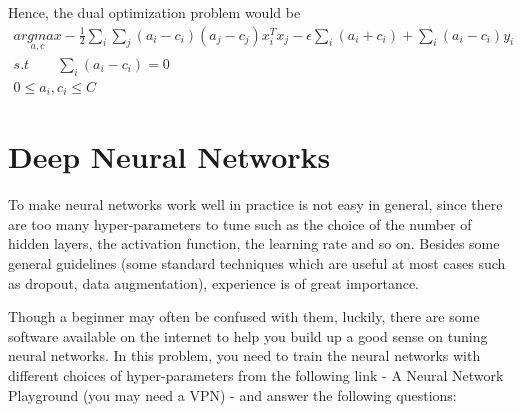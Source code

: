 \documentclass[12pt,a4paper]{article}
\begin{document}
	\noindent Hence, the dual optimization problem would be
	\begin{align*}
		\underset{a, c}{argmax}-\frac{1}{2}\sum_{i}\sum_{j}(a_i-c_i)(a_j-c_j)x_i^Tx_j-\epsilon\sum_{i}(a_i+c_i)+\sum_{i}(a_i-c_i)y_i \\
		s.t \qquad \sum_{i}(a_i-c_i)=0\qquad\qquad\qquad\qquad\qquad\qquad\\
		0 \leq a_i, c_i \leq C\qquad\qquad\qquad\qquad\qquad\qquad
	\end{align*}
	
	\section{Deep Neural Networks}
	
	\noindent To make neural networks work well in practice is not easy in general, since there are too many hyper-parameters to tune such as the choice of the number of hidden layers, the activation function, the learning rate and so on. Besides some general guidelines (some standard techniques which are useful at most cases such as dropout, data augmentation), experience is of great importance.
	
	\noindent Though a beginner may often be confused with them, luckily, there are some software available on the internet to help you build up a good sense on tuning neural networks. In this problem, you need to train the neural networks with different choices of hyper-parameters from the following link - A Neural Network Playground (you may need a VPN) - and answer the following questions:
	
\end{document}
